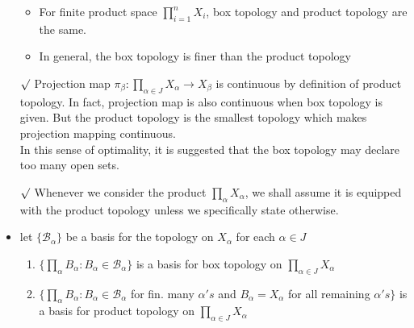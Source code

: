 \documentclass[12pt]{article}
\newcommand{\rmk}{$\surd$}
\begin{document}
\begin{itemize}
\begin{itemize}
		\item For finite product space $\prod_{i=1}^n X_i$, box topology and product topology are the same.
		\item In general, the box topology is finer than the product topology
	\end{itemize}
	\item[\rmk] Projection map $\pi_\beta : \prod_{\alpha\in J}X_\alpha \rightarrow X_\beta$ is continuous by definition of product topology. In fact, projection map is also continuous when box topology is given. But the product topology is the smallest topology which makes projection mapping continuous. \\ In this sense of optimality, it is suggested that the box topology may declare too many open sets. 
	\item[\rmk] Whenever we consider the product  $\prod_{\alpha}X_\alpha$, we shall assume it is equipped with the product topology unless we specifically state otherwise.
	\item let $\{\mathcal{B}_\alpha\}$ be a basis for the topology on $X_\alpha$ for each $\alpha\in J$
	\begin{enumerate}
		\item $\{\prod_\alpha B_\alpha : B_\alpha \in \mathcal{B}_\alpha \}$ is a basis for box topology on  $\prod_{\alpha\in J}X_\alpha$
		\item $\{\prod_\alpha B_\alpha : B_\alpha \in \mathcal{B}_\alpha$ for fin. many $\alpha's$ and $B_\alpha=X_\alpha$ for all remaining $\alpha's \}$ is a basis for product topology on $\prod_{\alpha\in J}X_\alpha$
	\end{enumerate}


\end{itemize}
\end{document}
